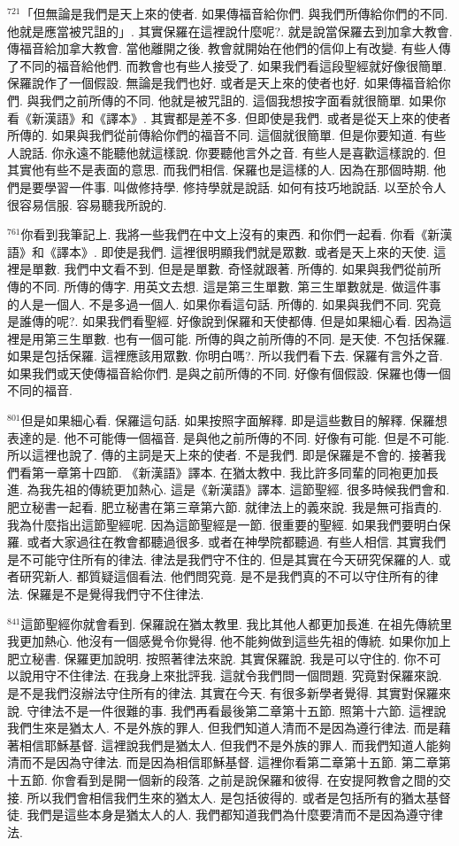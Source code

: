 \documentclass{book}
\begin{document}
$^{721}$「但無論是我們是天上來的使者.
如果傳福音給你們.
與我們所傳給你們的不同.
他就是應當被咒詛的」.
其實保羅在這裡說什麼呢?.
就是說當保羅去到加拿大教會.
傳福音給加拿大教會.
當他離開之後.
教會就開始在他們的信仰上有改變.
有些人傳了不同的福音給他們.
而教會也有些人接受了.
如果我們看這段聖經就好像很簡單.
保羅說作了一個假設.
無論是我們也好.
或者是天上來的使者也好.
如果傳福音給你們.
與我們之前所傳的不同.
他就是被咒詛的.
這個我想按字面看就很簡單.
如果你看《新漢語》和《譯本》.
其實都是差不多.
但即使是我們.
或者是從天上來的使者所傳的.
如果與我們從前傳給你們的福音不同.
這個就很簡單.
但是你要知道.
有些人說話.
你永遠不能聽他就這樣說.
你要聽他言外之音.
有些人是喜歡這樣說的.
但其實他有些不是表面的意思.
而我們相信.
保羅也是這樣的人.
因為在那個時期.
他們是要學習一件事.
叫做修持學.
修持學就是說話.
如何有技巧地說話.
以至於令人很容易信服.
容易聽我所說的.

$^{761}$你看到我筆記上.
我將一些我們在中文上沒有的東西.
和你們一起看.
你看《新漢語》和《譯本》.
即使是我們.
這裡很明顯我們就是眾數.
或者是天上來的天使.
這裡是單數.
我們中文看不到.
但是是單數.
奇怪就跟著.
所傳的.
如果與我們從前所傳的不同.
所傳的傳字.
用英文去想.
這是第三生單數.
第三生單數就是.
做這件事的人是一個人.
不是多過一個人.
如果你看這句話.
所傳的.
如果與我們不同.
究竟是誰傳的呢?.
如果我們看聖經.
好像說到保羅和天使都傳.
但是如果細心看.
因為這裡是用第三生單數.
也有一個可能.
所傳的與之前所傳的不同.
是天使.
不包括保羅.
如果是包括保羅.
這裡應該用眾數.
你明白嗎?.
所以我們看下去.
保羅有言外之音.
如果我們或天使傳福音給你們.
是與之前所傳的不同.
好像有個假設.
保羅也傳一個不同的福音.

$^{801}$但是如果細心看.
保羅這句話.
如果按照字面解釋.
即是這些數目的解釋.
保羅想表達的是.
他不可能傳一個福音.
是與他之前所傳的不同.
好像有可能.
但是不可能.
所以這裡也說了.
傳的主詞是天上來的使者.
不是我們.
即是保羅是不會的.
接著我們看第一章第十四節.
《新漢語》譯本.
在猶太教中.
我比許多同輩的同袍更加長進.
為我先祖的傳統更加熱心.
這是《新漢語》譯本.
這節聖經.
很多時候我們會和.
肥立秘書一起看.
肥立秘書在第三章第六節.
就律法上的義來說.
我是無可指責的.
我為什麼指出這節聖經呢.
因為這節聖經是一節.
很重要的聖經.
如果我們要明白保羅.
或者大家過往在教會都聽過很多.
或者在神學院都聽過.
有些人相信.
其實我們是不可能守住所有的律法.
律法是我們守不住的.
但是其實在今天研究保羅的人.
或者研究新人.
都質疑這個看法.
他們問究竟.
是不是我們真的不可以守住所有的律法.
保羅是不是覺得我們守不住律法.

$^{841}$這節聖經你就會看到.
保羅說在猶太教里.
我比其他人都更加長進.
在祖先傳統里我更加熱心.
他沒有一個感覺令你覺得.
他不能夠做到這些先祖的傳統.
如果你加上肥立秘書.
保羅更加說明.
按照著律法來說.
其實保羅說.
我是可以守住的.
你不可以說用守不住律法.
在我身上來批評我.
這就令我們問一個問題.
究竟對保羅來說.
是不是我們沒辦法守住所有的律法.
其實在今天.
有很多新學者覺得.
其實對保羅來說.
守律法不是一件很難的事.
我們再看最後第二章第十五節.
照第十六節.
這裡說我們生來是猶太人.
不是外族的罪人.
但我們知道人清而不是因為遵行律法.
而是藉著相信耶穌基督.
這裡說我們是猶太人.
但我們不是外族的罪人.
而我們知道人能夠清而不是因為守律法.
而是因為相信耶穌基督.
這裡你看第二章第十五節.
第二章第十五節.
你會看到是開一個新的段落.
之前是說保羅和彼得.
在安提阿教會之間的交接.
所以我們會相信我們生來的猶太人.
是包括彼得的.
或者是包括所有的猶太基督徒.
我們是這些本身是猶太人的人.
我們都知道我們為什麼要清而不是因為遵守律法.
\end{document}
